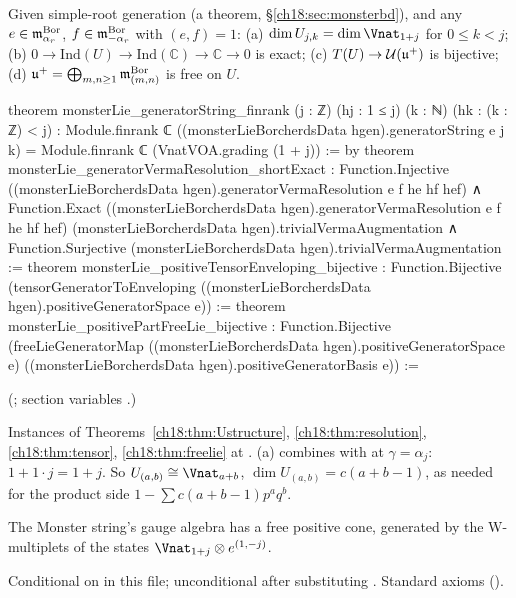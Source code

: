 \begin{theorem}\label{ch18:thm:monsterstructure}
Given simple-root generation (a theorem, \S\ref{ch18:sec:monsterbd}), and any $e\in\mathfrak{m}^{\mathrm{Bor}}_{\alpha_r}$, $f\in\mathfrak{m}^{\mathrm{Bor}}_{-\alpha_r}$ with $(e,f)=1$:
(a) $\dim U_{j,k}=\dim\Vnat_{1+j}$ for $0\le k<j$; (b) $0\to \mathrm{Ind}(U)\to \mathrm{Ind}(\mathbb C)\to\mathbb C\to0$ is exact; (c) $T(U)\to \mathcal U(\mathfrak{u}^+)$ is bijective;
(d) $\mathfrak{u}^+=\bigoplus_{m,n\ge1}\mathfrak{m}^{\mathrm{Bor}}_{(m,n)}$ is free on $U$.
\end{theorem}
\begin{leancode}
theorem monsterLie_generatorString_finrank (j : ℤ) (hj : 1 ≤ j) (k : ℕ) (hk : (k : ℤ) < j) :
    Module.finrank ℂ ((monsterLieBorcherdsData hgen).generatorString e j k) =
      Module.finrank ℂ (VnatVOA.grading (1 + j)) := by
theorem monsterLie_generatorVermaResolution_shortExact :
    Function.Injective ((monsterLieBorcherdsData hgen).generatorVermaResolution e f he hf hef) ∧
      Function.Exact ((monsterLieBorcherdsData hgen).generatorVermaResolution e f he hf hef)
        (monsterLieBorcherdsData hgen).trivialVermaAugmentation ∧
      Function.Surjective (monsterLieBorcherdsData hgen).trivialVermaAugmentation :=
theorem monsterLie_positiveTensorEnveloping_bijective :
    Function.Bijective (tensorGeneratorToEnveloping
      ((monsterLieBorcherdsData hgen).positiveGeneratorSpace e)) :=
theorem monsterLie_positivePartFreeLie_bijective :
    Function.Bijective (freeLieGeneratorMap
      ((monsterLieBorcherdsData hgen).positiveGeneratorSpace e)
      ((monsterLieBorcherdsData hgen).positiveGeneratorBasis e)) :=
\end{leancode}
(; section variables
.)
\begin{dictionary}
Instances of Theorems~\ref{ch18:thm:Ustructure}, \ref{ch18:thm:resolution}, \ref{ch18:thm:tensor}, \ref{ch18:thm:freelie} at
.  (a) combines  with  at $\gamma=\alpha_j$:
$1+1\cdot j=1+j$.  So $U_{(a,b)}\cong\Vnat_{a+b}$, $\dim U_{(a,b)}=c(a+b-1)$, as needed for the product side $1-\sum c(a+b-1)p^aq^b$.
\end{dictionary}
\begin{physics}The Monster string's gauge algebra has a free positive cone, generated by the W-multiplets of the states $\Vnat_{1+j}\otimes e^{(1,-j)}$.\end{physics}
\begin{status}
Conditional on  in this file; unconditional after substituting .  Standard axioms
().
\end{status}

